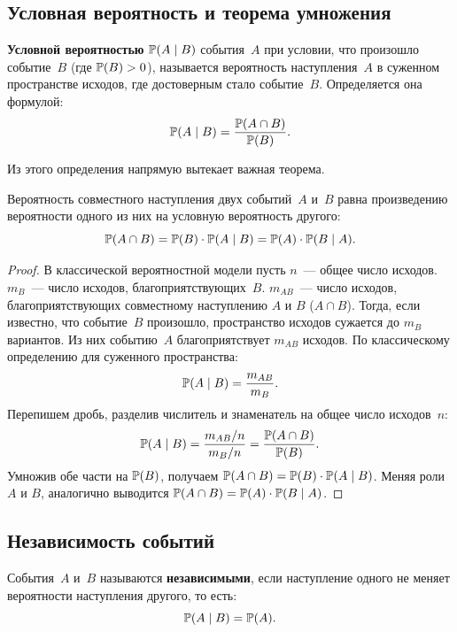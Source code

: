 \subsection{Условная вероятность и теорема умножения}

\begin{definition}
\textbf{Условной вероятностью} $\mathbb{P}(A \mid B)$ события~$A$ при условии, что произошло событие~$B$ (где $\mathbb{P}(B) > 0$), называется вероятность наступления~$A$ в суженном пространстве исходов, где достоверным стало событие~$B$.
Определяется она формулой:
\[
\mathbb{P}(A \mid B) = \frac{\mathbb{P}(A \cap B)}{\mathbb{P}(B)}.
\]
\end{definition}

Из этого определения напрямую вытекает важная теорема.

\begin{theorem}
Вероятность совместного наступления двух событий~$A$ и~$B$ равна произведению вероятности одного из них на условную вероятность другого:
\[
\mathbb{P}(A \cap B) = \mathbb{P}(B) \cdot \mathbb{P}(A \mid B) = \mathbb{P}(A) \cdot \mathbb{P}(B \mid A).
\]
\end{theorem}

\begin{proof}
В классической вероятностной модели пусть $n$~--- общее число исходов. $m_B$~--- число исходов, благоприятствующих~$B$. $m_{AB}$~--- число исходов, благоприятствующих совместному наступлению $A$ и $B$ ($A \cap B$).
Тогда, если известно, что событие~$B$ произошло, пространство исходов сужается до $m_B$ вариантов. Из них событию~$A$ благоприятствует $m_{AB}$ исходов.
По классическому определению для суженного пространства:
\[
\mathbb{P}(A \mid B) = \frac{m_{AB}}{m_B}.
\]
Перепишем дробь, разделив числитель и знаменатель на общее число исходов~$n$:
\[
\mathbb{P}(A \mid B) = \frac{m_{AB} / n}{m_B / n} = \frac{\mathbb{P}(A \cap B)}{\mathbb{P}(B)}.
\]
Умножив обе части на $\mathbb{P}(B)$, получаем $\mathbb{P}(A \cap B) = \mathbb{P}(B) \cdot \mathbb{P}(A \mid B)$. Меняя роли $A$ и $B$, аналогично выводится $\mathbb{P}(A \cap B) = \mathbb{P}(A) \cdot \mathbb{P}(B \mid A)$.
\end{proof}

\subsection{Независимость событий}

\begin{definition}
События~$A$ и~$B$ называются \textbf{независимыми}, если наступление одного не меняет вероятности наступления другого, то есть:
\[
\mathbb{P}(A \mid B) = \mathbb{P}(A).
\]
\end{definition}


